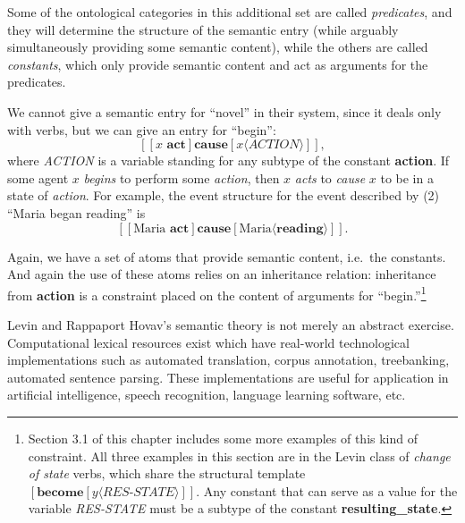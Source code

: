 Some of the ontological categories in this additional set are called \emph{predicates}, and they will determine the structure of the semantic entry (while arguably simultaneously providing some semantic content), while the others are called \emph{constants}, which only provide semantic content and act as arguments for the predicates.

We cannot give a semantic entry for ``novel'' in their system, since it deals only with verbs, but we can give an entry for ``begin'':
$$[[ x\textbf{ act}]\textbf{cause}[x\langle\textit{ACTION}\rangle]],$$
where \emph{ACTION} is a variable standing for any subtype of the constant {\bf action}. If some agent $x$ \emph{begins} to perform some \emph{action}, then $x$ \emph{acts} to \emph{cause} $x$ to be in a state of \emph{action}. For example, the event structure for the event described by (2) ``Maria began reading'' is
$$[[ \text{Maria}\textbf{ act}]\textbf{cause}[\text{Maria} \langle\textbf{reading}\rangle]].$$

Again, we have a set of atoms that provide semantic content, i.e.\ the constants. And again the use of these atoms relies on an inheritance relation: inheritance from {\bf action} is a constraint placed on the content of arguments for ``begin.''\footnote{Section 3.1 of this chapter includes some more examples of this kind of constraint. All three examples in this section are in the Levin class of \emph{change of state} verbs, which share the structural template $[\textbf{become}[y\langle\textit{RES-STATE}\rangle]]$. Any constant that can serve as a value for the variable \emph{RES-STATE} must be a subtype of the constant {\bf resulting\_state}.}

Levin and Rappaport Hovav's semantic theory is not merely an abstract exercise. Computational lexical resources exist which have real-world technological implementations such as automated translation, corpus annotation, treebanking, automated sentence parsing. These implementations are useful for application in artificial intelligence, speech recognition, language learning software, etc.

